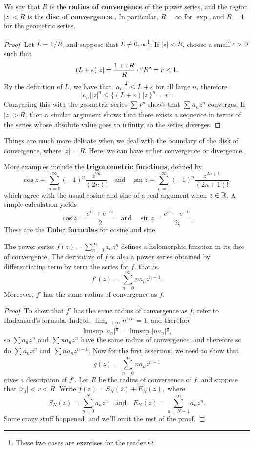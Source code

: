     We say that $R$ is the \textbf{radius of convergence} of the power series, and the region $|z|<R$ is the \textbf{disc of convergence} . In particular, $R=\infty$ for $\exp$, and $R=1$ for the geometric series.
\begin{proof}
    Let $L=1 /R$, and suppose that $L\neq 0,\infty$\footnote{These two cases are exercises for the reader.}. If $|z|<R$, choose a small $\varepsilon >0$ such that \[
        (L+\varepsilon )|z|=\frac{1+\varepsilon R}{R}\cdot ``R"=r<1.
    \] By the definition of $L$, we have that $|a_n |^{\frac{1}{n}}\leq L+\varepsilon $ for all large $n$, therefore \[
    |a_n | |z|^n \leq \{(L+\varepsilon )|z|\} ^n =r^n .
    \] Comparing this with the geometric series $\sum_{}^{} r^n $ shows that $\sum_{}^{} a_n z^n $ converges. If $|z|>R$, then a similar argument shows that there exists a sequence in terms of the series whose absolute value goes to infinity, so the series diverges.
\end{proof}
\begin{remark}
    Things are much more delicate when we deal with the boundary of the disk of convergence, where $|z|=R$. Here, we can have either convergence or divergence.
\end{remark}
More examples include the \textbf{trigonometric functions}, defined by \[
    \cos z= \sum_{n=0}^{\infty} (-1)^n \frac{z^{2n}}{(2n)!}\quad \text{and}\quad \sin z =\sum_{n=0}^{\infty} (-1)^n  \frac{z^{2n+1}}{(2n+1)!},
\] which agree with the usual cosine and sine of a real argument when $z\in \mathbb{R}$. A simple calculation yields \[
\cos z=\frac{e^{iz}+e^{-iz}}{2}\quad \text{and} \quad \sin z = \frac{e^{iz}-e^{-iz}}{2i}.
\] These are the \textbf{Euler formulas} for cosine and sine.
\begin{theorem}\label{analytic}
    The power series $f(z)=\sum_{n=0}^{\infty} a_n z^n $ defines a holomorphic function in its disc of convergence. The derivative of $f$ is also a power series obtained by differentiating term by term the series for $f$, that is, \[
        f'(z)= \sum_{n=0}^{\infty} na_n z^{n-1}.
    \] Moreover, $f'$ has the same radius of convergence as $f$.
\end{theorem}
\begin{proof}
    To show that $f'$ has the same radius of convergence as $f$, refer to Hadamard's formula. Indeed, $\lim_{n\to \infty}n^{1 /n}=1$, and therefore \[
   \limsup |a_n |^{\frac{1}{n} } =\limsup |na_n |^{\frac{1}{n}} ,
    \] so $\sum_{}^{} a_n z^n $ and $\sum_{}^{} na_n z^n $ have the same radius of convergence, and therefore so do $\sum_{}^{} a_n x^n$ and $\sum_{}^{} na_n z^{n-1}$. Now for the first assertion, we need to show that \[
    g(z)=\sum_{n=0}^{\infty} na_n z^{n-1} 
\] gives a description of $f'$. Let $R$ be the radius of convergence of $f$, and suppose that $|z_0|<r<R$. Write $
f(z)=S_N(z)+E_N(z),
$ where \[
    S_N(z)=\sum_{n=0}^{N} a_n z^n\quad \text{and} \quad E_N(z)=\sum_{n=N+1}^{\infty} a_n z^n.
\] Some crazy stuff happened, and we'll omit the rest of the proof.
\end{proof}
